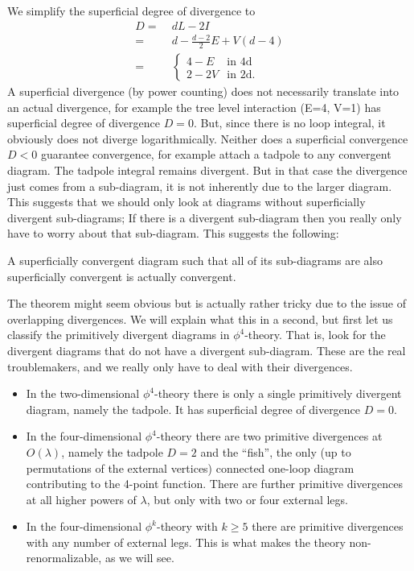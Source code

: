 We simplify the superficial degree of divergence to 
\begin{equation}
  \begin{split}
    D =&\; dL - 2I
    \\ =&\;
    d - \frac{d-2}{2}E + V(d-4)
    \\ =&\;
    \begin{cases}
      4-E & \text{in 4d} \\
      2-2V & \text{in 2d}.
    \end{cases}
  \end{split}
\end{equation}
A superficial divergence (by power counting) does not necessarily
translate into an actual divergence, for example the tree level
interaction (E=4, V=1) has superficial degree of divergence
$D=0$. But, since there is no loop integral, it obviously does not
diverge logarithmically. Neither does a superficial convergence $D<0$
guarantee convergence, for example attach a tadpole to any convergent
diagram. The tadpole integral remains divergent. But in that case the
divergence just comes from a sub-diagram, it is not inherently due to
the larger diagram. This suggests that we should only look at diagrams
without superficially divergent sub-diagrams; If there is a divergent
sub-diagram then you really only have to worry about that
sub-diagram. This suggests the following:
\begin{theorem}
  A superficially convergent diagram such that all of its sub-diagrams are
  also superficially convergent is actually convergent.
\end{theorem}
The theorem might seem obvious but is actually rather tricky due to
the issue of overlapping divergences. We will explain what this in a
second, but first let us classify the primitively divergent diagrams
in $\phi^4$-theory. That is, look for the divergent diagrams that do
not have a divergent sub-diagram. These are the real troublemakers,
and we really only have to deal with their divergences.
\begin{itemize}
\item In the two-dimensional $\phi^4$-theory there is only a single
  primitively divergent diagram, namely the tadpole. It has
  superficial degree of divergence $D=0$.
\item In the four-dimensional $\phi^4$-theory there are two primitive
  divergences at $O(\lambda)$, namely the tadpole $D=2$ and the
  ``fish'', the only (up to permutations of the external vertices)
  connected one-loop diagram contributing to the 4-point
  function. There are further primitive divergences at all higher
  powers of $\lambda$, but only with two or four external legs.
\item In the four-dimensional $\phi^k$-theory with $k\geq 5$ there are
  primitive divergences with any number of external legs. This is what
  makes the theory non-renormalizable, as we will see.
\end{itemize}


